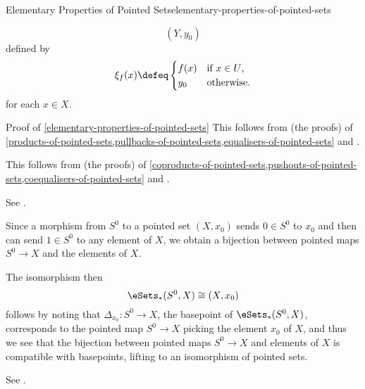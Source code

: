 \begin{proposition}{Elementary Properties of Pointed Sets}{elementary-properties-of-pointed-sets}
\begin{enumerate}
\begin{enumerate}
\begin{enumerate}
\[                                (Y,y_{0})%
                            \]%
                            defined by
                            \[
                                \xi_{f}(x)%
                                \defeq%
                                \begin{cases}
                                    f(x)  &\text{if $x\in U$,}\\
                                    y_{0} &\text{otherwise.}
                                \end{cases}
                            \]%
                            for each $x\in X$.
                    \end{enumerate}
            \end{enumerate}
    \end{enumerate}
\end{proposition}
\begin{Proof}{Proof of \cref{elementary-properties-of-pointed-sets}}%
    This follows from (the proofs) of \cref{products-of-pointed-sets,pullbacks-of-pointed-sets,equalisers-of-pointed-sets} and .

    This follows from (the proofs) of \cref{coproducts-of-pointed-sets,pushouts-of-pointed-sets,coequalisers-of-pointed-sets} and .

    See \cite{MSE2855868}.

    Since a morphism from $S^{0}$ to a pointed set $(X,x_{0})$ sends $0\in S^{0}$ to $x_{0}$ and then can send $1\in S^{0}$ to any element of $X$, we obtain a bijection between pointed maps $S^{0}\to X$ and the elements of $X$.

    The isomorphism then
    \[
        \eSets_{*}(S^{0},X)
        \cong
        (X,x_{0})
    \]%
    follows by noting that $\Delta_{x_{0}}\colon S^{0}\to X$, the basepoint of $\eSets_{*}(S^{0},X)$, corresponds to the pointed map $S^{0}\to X$ picking the element $x_{0}$ of $X$, and thus we see that the bijection between pointed maps $S^{0}\to X$ and elements of $X$ is compatible with basepoints, lifting to an isomorphism of pointed sets.

    See \cite{MSE884460}.
\end{Proof}
